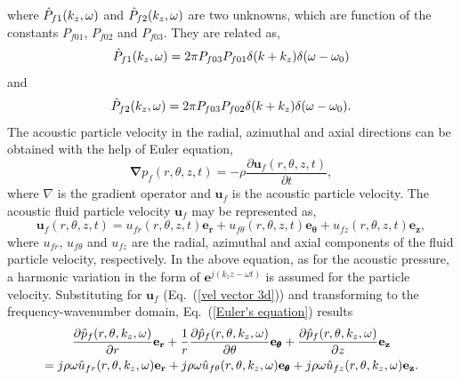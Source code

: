 \documentclass[11pt,cleanfoot]{asme2ej}
\begin{document}
where $\Hat{P}_{f1}(k_z,\omega)$ and $\Hat{P}_{f2}(k_z,\omega)$ are two unknowns, which are function of the constants $P_{f01}$, $P_{f02}$ and $P_{f03}$. They are related as,
\begin{equation}
    \Hat{P}_{f1}(k_z,\omega) = 2\pi P_{f03}P_{f01}\delta(k+k_z)\delta(\omega-\omega_0)
\end{equation}
and
\begin{equation}
    \Hat{P}_{f2}(k_z,\omega) = 2\pi P_{f03}P_{f02}\delta(k+k_z)\delta(\omega-\omega_0).
\end{equation}
The acoustic particle velocity in the radial, azimuthal and axial directions can be obtained with the help of Euler equation,
\begin{equation}\label{Euler's equation}
    \pmb{\nabla} p_{f}(r,\theta,z,t) = -\rho \frac{\partial \mathbf{u}_f(r,\theta,z,t)}{\partial t},
\end{equation}
where $\nabla$ is the gradient operator and $\mathbf{u}_f$ is the acoustic particle velocity. The acoustic fluid particle velocity $\mathbf{u}_f$ may be represented as,
\begin{equation}\label{vel vector 3d}
    \mathbf{u}_f(r,\theta,z,t) = u_{fr}(r,\theta,z,t)\mathbf{e_r} + u_{f\theta}(r,\theta,z,t)\mathbf{e}_{\pmb{\theta}} + u_{fz}(r,\theta,z,t)\mathbf{e_z},
\end{equation}
where $u_{fr}$, $u_{f\theta}$ and $u_{fz}$ are the radial, azimuthal and axial components of the fluid particle velocity, respectively. In the above equation, as for the acoustic pressure, a harmonic variation in the form of $\mathbf{e}^{j(k_{z}z-\omega t)}$ is assumed for the particle velocity. Substituting for $\mathbf{u}_f$ (Eq.~(\ref{vel vector 3d})) and transforming to the frequency-wavenumber domain, Eq.~(\ref{Euler's equation}) results
\begin{multline}\label{equating continuity equation}
    \frac{\partial \Hat{p}_f(r,\theta,k_z,\omega)}{\partial r}\mathbf{e_r} + \frac{1}{r}\frac{\partial \Hat{p}_f(r,\theta,k_z,\omega)}{\partial \theta}\mathbf{e}_{\pmb{\theta}} + \frac{\partial \Hat{p}_f(r,\theta,k_z,\omega)}{\partial z}\mathbf{e_z}\\ = j\rho\omega \Hat{u}_{fr}(r,\theta,k_z,\omega)\mathbf{e_r} + j\rho\omega \Hat{u}_{f\theta}(r,\theta,k_z,\omega) \mathbf{e}_{\pmb{\theta}} + j\rho\omega \Hat{u}_{fz}(r,\theta,k_z,\omega)\mathbf{e_z}.
\end{multline}
\end{document}
